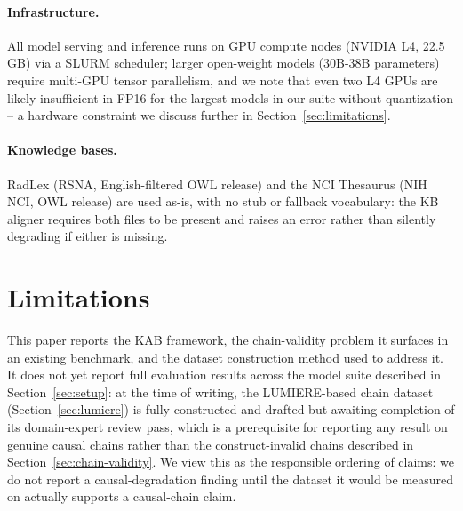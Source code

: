 \documentclass[11pt]{article}
\begin{document}
\paragraph{Infrastructure.} All model serving and inference runs on GPU compute nodes (NVIDIA L4, 22.5\,GB) via a SLURM scheduler; larger open-weight models (30B-38B parameters) require multi-GPU tensor parallelism, and we note that even two L4 GPUs are likely insufficient in FP16 for the largest models in our suite without quantization -- a hardware constraint we discuss further in Section~\ref{sec:limitations}.

\paragraph{Knowledge bases.} RadLex (RSNA, English-filtered OWL release) and the NCI Thesaurus (NIH NCI, OWL release) are used as-is, with no stub or fallback vocabulary: the KB aligner requires both files to be present and raises an error rather than silently degrading if either is missing.

\section*{Limitations}
\label{sec:limitations}

This paper reports the KAB framework, the chain-validity problem it surfaces in an existing benchmark, and the dataset construction method used to address it. It does not yet report full evaluation results across the model suite described in Section~\ref{sec:setup}: at the time of writing, the LUMIERE-based chain dataset (Section~\ref{sec:lumiere}) is fully constructed and drafted but awaiting completion of its domain-expert review pass, which is a prerequisite for reporting any result on genuine causal chains rather than the construct-invalid chains described in Section~\ref{sec:chain-validity}. We view this as the responsible ordering of claims: we do not report a causal-degradation finding until the dataset it would be measured on actually supports a causal-chain claim.
\end{document}
